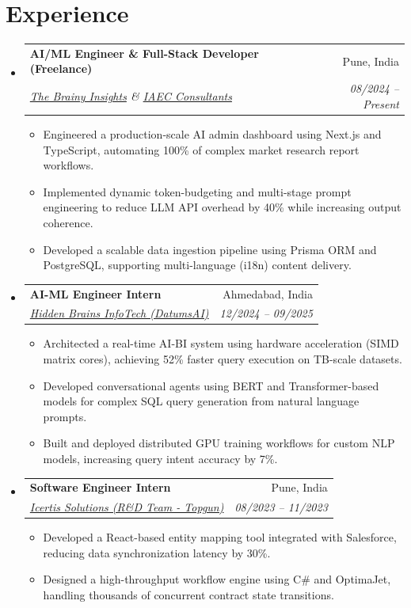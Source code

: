 \documentclass[10pt,a4paper]{article}
\makeatletter
\newcommand{\resumeItem}[1]{\item\small{#1}}
\newcommand{\resumeSubheading}[4]{
  \vspace{-1pt}\item
    \begin{tabular*}{1.0\textwidth}[t]{l@{\extracolsep{\fill}}r}
      \textbf{#1} & #2 \\
      \textit{\small#3} & \textit{\small #4} \\
    \end{tabular*}\vspace{-5pt}
}
\makeatother
\begin{document}
\section{Experience}
\begin{itemize}[label={}]
    \resumeSubheading
      {AI/ML Engineer \& Full-Stack Developer (Freelance)}{Pune, India}
      {\href{https://thebrainyinsights.com}{The Brainy Insights} \& \href{https://iaec.co.in}{IAEC Consultants}}{08/2024 -- Present}
      \begin{itemize}
        \resumeItem{Engineered a production-scale AI admin dashboard using Next.js and TypeScript, automating 100\% of complex market research report workflows.}
        \resumeItem{Implemented dynamic token-budgeting and multi-stage prompt engineering to reduce LLM API overhead by 40\% while increasing output coherence.}
        \resumeItem{Developed a scalable data ingestion pipeline using Prisma ORM and PostgreSQL, supporting multi-language (i18n) content delivery.}
      \end{itemize}

    \resumeSubheading
      {AI-ML Engineer Intern}{Ahmedabad, India}
      {\href{https://hiddenbrains.com}{Hidden Brains InfoTech (DatumsAI)}}{12/2024 -- 09/2025}
      \begin{itemize}
        \resumeItem{Architected a real-time AI-BI system using hardware acceleration (SIMD matrix cores), achieving 52\% faster query execution on TB-scale datasets.}
        \resumeItem{Developed conversational agents using BERT and Transformer-based models for complex SQL query generation from natural language prompts.}
        \resumeItem{Built and deployed distributed GPU training workflows for custom NLP models, increasing query intent accuracy by 7\%.}
      \end{itemize}

    \resumeSubheading
      {Software Engineer Intern}{Pune, India}
      {\href{https://icertis.com}{Icertis Solutions (R\&D Team - Topgun)}}{08/2023 -- 11/2023}
      \begin{itemize}
        \resumeItem{Developed a React-based entity mapping tool integrated with Salesforce, reducing data synchronization latency by 30\%.}
        \resumeItem{Designed a high-throughput workflow engine using C\# and OptimaJet, handling thousands of concurrent contract state transitions.}
      \end{itemize}
\end{itemize}
\end{document}
